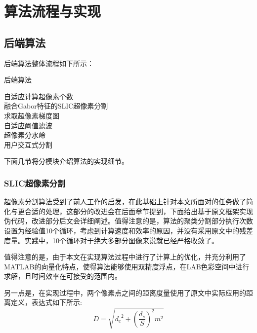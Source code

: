 \documentclass[UTF8]{ctexart}
\begin{document}
\section{算法流程与实现}

\subsection{后端算法}
后端算法整体流程如下所示：

\begin{algorithm}[H]
    \caption{后端算法}
    自适应计算超像素个数\\
    融合Gabor特征的SLIC超像素分割\\
    求取超像素梯度图\\
    自适应阈值滤波\\
    超像素分水岭\\
    用户交互式分割
\end{algorithm}
下面几节将分模块介绍算法的实现细节。

\subsubsection{SLIC超像素分割}
超像素分割算法受到了前人工作\cite{ref1}的启发，在此基础上针对本文所面对的任务做了简化与更合适的处理，这部分的改进会在后面章节提到，下面给出基于原文框架实现伪代码，改进部分后文会详细阐述。值得注意的是，算法的聚类分割部分执行次数设置为经验值10个循环，考虑到计算速度和效率的原因，并没有采用原文中的残差度量。实践中，10个循环对于绝大多部分图像来说就已经严格收敛了。

值得注意的是，由于本文在实现算法过程中进行了计算上的优化，并充分利用了MATLAB的向量化特点，使得算法能够使用双精度浮点，在LAB色彩空间中进行求解，且时间效率在可接受的范围内。

另一点是，在实现过程中，两个像素点之间的距离度量使用了原文中实际应用的距离定义，表达式如下所示:
\begin{equation}
    D = \sqrt{{d_c}^2 + (\frac{d_s}{S})^2m^2}
\end{equation}
\end{document}
